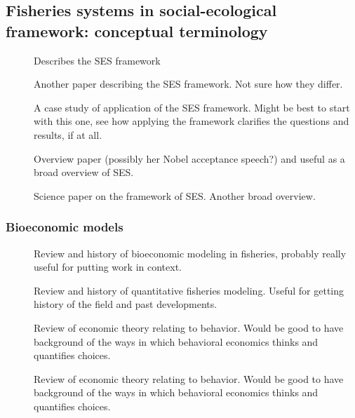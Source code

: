 \documentclass[a4paper,10pt]{report}
\begin{document}
\subsection{Fisheries systems in social-ecological framework: conceptual terminology}
\begin{description}
\item[\cite{@Schluteretal:2013}] Describes the SES framework
\item[\cite{@McGinnisOstrom:2013}] Another paper describing the SES framework. Not sure how they differ.
\item[\cite{@Cox:2013}] A case study of application of the SES framework. Might be best to start with this one, see how applying the framework clarifies the questions and results, if at all. 
\item[\cite{Ostrom:2010}] Overview paper (possibly her Nobel acceptance speech?) and useful as a broad overview of SES. 
\item[\cite{Ostrom:2009}] Science paper on the framework of SES. Another broad overview. 
\end{description}

\subsubsection{Bioeconomic models}
\begin{description}
\item[\cite{ConradSmith:2012}] Review and history of bioeconomic modeling in fisheries, probably really useful for putting work in context. 
\item[\cite{Hilborn:2012}] Review and history of quantitative fisheries modeling. Useful for getting history of the field and past developments. 
\item[\cite{Pesendorfer:2006}] Review of economic theory relating to behavior. Would be good to have background of the ways in which behavioral economics thinks and quantifies choices. 
\item[\cite{Fudenberg:2006}] Review of economic theory relating to behavior. Would be good to have background of the ways in which behavioral economics thinks and quantifies choices. 
\end{description}

\end{document}
